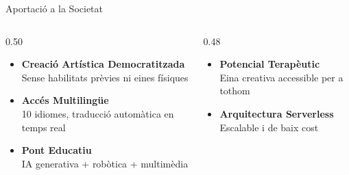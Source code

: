 \documentclass[12pt, aspectratio=169]{beamer}
\begin{document}
\begin{frame}{Aportació a la Societat}
  \begin{columns}[T]
    \begin{column}{0.50\textwidth}
      \begin{itemize}\footnotesize
        \item[\alert{\faPalette}] \textbf{Creació Artística Democratitzada}\\
              \scriptsize Sense habilitats prèvies ni eines físiques
        \item[\alert{\faGlobeEurope}] \textbf{Accés Multilingüe}\\
              \scriptsize 10 idiomes, traducció automàtica en temps real
        \item[\alert{\faRobot}] \textbf{Pont Educatiu}\\
              \scriptsize IA generativa + robòtica + multimèdia
      \end{itemize}
    \end{column}
    \begin{column}{0.48\textwidth}
      \begin{itemize}\footnotesize
        \item[\alert{\faUniversalAccess}] \textbf{Potencial Terapèutic}\\
              \scriptsize Eina creativa accessible per a tothom
        \item[\alert{\faCloud}] \textbf{Arquitectura Serverless}\\
              \scriptsize Escalable i de baix cost
      \end{itemize}
    \end{column}
  \end{columns}

\end{frame}
\end{document}
